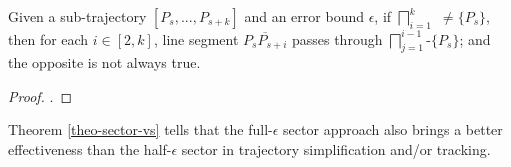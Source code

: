 \begin{theorem}
	\label{theo-sector-vs}
	Given a sub-trajectory $[P_s,...,P_{s+k}]$ and an error bound $\epsilon$, if $\bigsqcap_{i=1}^{k}$ $\ne \{P_s\}$, then for each $i \in [2, k]$, line segment $\overline{P_sP_{s+i}}$ passes through $\bigsqcap_{j=1}^{i-1}$-$\{P_s\}$; and the opposite is not always true.
\end{theorem}

\begin{proof}
	\todo.
\end{proof}

Theorem \ref{theo-sector-vs} tells that the full-$\epsilon$ sector approach also brings a better effectiveness than the half-$\epsilon$ sector in trajectory simplification and/or tracking.


